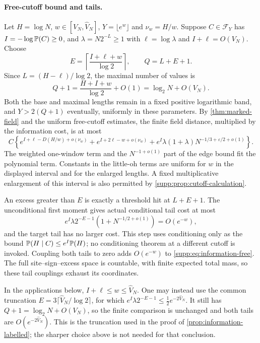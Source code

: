 \paragraph{Free-cutoff bound and tails.}
Let $H=\log N$, $w\in[V_N,\widehat V_N]$, $Y=\lfloor e^w\rfloor$
and $\nu_w=H/w$. Suppose $C\in\mathcal F_Y$ has
$I=-\log\mathbb P(C)\ge0$, and $\lambda=N2^{-L}\ge1$ with
$\ell=\log\lambda$ and $I+\ell=O(V_N)$. Choose
\[
 E=\left\lceil\frac{I+\ell+w}{\log2}\right\rceil,
 \qquad Q=L+E+1.
\]
Since $L=(H-\ell)/\log2$, the maximal number of values is
\[
 Q+1=\frac{H+I+w}{\log2}+O(1)=\log_2N+O(V_N).
\]
Both the base and maximal lengths remain in a fixed positive logarithmic
band, and $Y>2(Q+1)$ eventually, uniformly in these parameters.
By \cref{thm:marked-field} and the uniform free-cutoff estimates, the
finite field distance, multiplied by the information cost, is at most
\begin{equation}\label{supp:eq:information-free}
 C\left\{
 e^{I+\ell-D(H/w)+o(\nu_w)}+
 e^{I+2\ell-w+o(\nu_w)}+
 e^I\lambda(1+\lambda)N^{-1/3+\varepsilon/2+o(1)}
 \right\}.
\end{equation}
The weighted one-window term and the $N^{-1+o(1)}$ part of the edge
bound fit the polynomial term. Constants in the little-oh terms are
uniform for $w$ in the displayed interval and for the enlarged lengths.
A fixed multiplicative enlargement of this interval is also permitted by
\cref{supp:prop:cutoff-calculation}.

An excess greater than $E$ is exactly a threshold hit at $L+E+1$.
The unconditional first moment gives actual conditional tail cost at most
\[
 e^I\lambda2^{-E-1}(1+N^{-1/2+o(1)})=O(e^{-w}),
\]
and the target tail has no larger cost. This step uses conditioning only
as the bound $\mathbb P(H\mid C)\le e^I\mathbb P(H)$; no conditioning theorem at
a different cutoff is invoked. Coupling both tails to zero adds
$O(e^{-w})$ to \eqref{supp:eq:information-free}. The full site--sign--excess
space is countable, with finite expected total mass, so these tail
couplings exhaust its coordinates.

In the applications below, $I+\ell\le w\le\widehat V_N$. One may instead
use the common truncation $E=3\lceil\widehat V_N/\log2\rceil$, for which
$e^I\lambda2^{-E-1}\le \tfrac12 e^{-2\widehat V_N}$.
It still has $Q+1=\log_2N+O(V_N)$, so the finite comparison is unchanged
and both tails are $O(e^{-2\widehat V_N})$. This is the truncation used
in the proof of \cref{prop:information-labelled}; the sharper choice
above is not needed for that conclusion.

